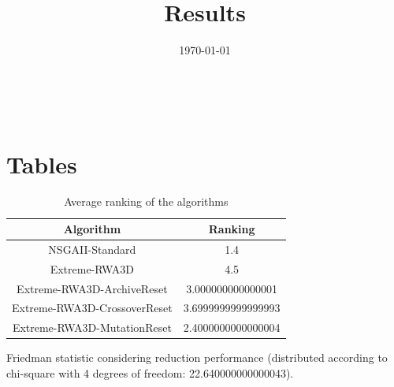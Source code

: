 \documentclass{article}
\title{Results}
\author{}
\date{\today}
\begin{document}
\oddsidemargin 0in \topmargin 0in\maketitle
\
\section{Tables}
\begin{table}[!htp]
\centering
\caption{Average ranking of the algorithms}
\begin{tabular}{c|c}
Algorithm&Ranking\\
\hline
NSGAII-Standard&1.4\\
Extreme-RWA3D&4.5\\
Extreme-RWA3D-ArchiveReset&3.000000000000001\\
Extreme-RWA3D-CrossoverReset&3.6999999999999993\\
Extreme-RWA3D-MutationReset&2.4000000000000004\\
\end{tabular}
\end{table}


Friedman statistic considering reduction performance (distributed according to chi-square with 4 degrees of freedom: 22.640000000000043).
\end{document}
